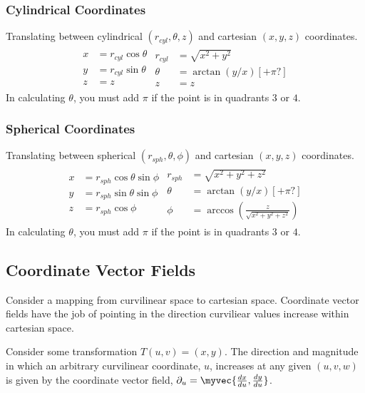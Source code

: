 \documentclass[11pt]{article}
\newenvironment{mybox}
{\begin{tcolorbox}[colback=red!5!white,colframe=red!75!black]}
{\end{tcolorbox}}
\begin{document}
\subsubsection{Cylindrical Coordinates}
\begin{mybox}
    Translating between cylindrical $(r_{cyl},\theta,z)$ and cartesian $(x,y,z)$ coordinates.
    \begin{align*}
        \begin{split}
            x &= r_{cyl}\cos{\theta}\\
            y &= r_{cyl}\sin{\theta}\\
            z &= z
        \end{split}
        \begin{split}
            r_{cyl} &= \sqrt{x^2+y^2} \\
        \theta &= \arctan{\left(y/x\right)} [+\pi?]\\
        z &= z
        \end{split}
    \end{align*}
    In calculating $\theta$, you must add $\pi$ if the point is in quadrants $3$ or $4$.
\end{mybox}
\subsubsection{Spherical Coordinates}
\begin{mybox}
Translating between spherical $(r_{sph},\theta,\phi)$ and cartesian $(x,y,z)$ coordinates.
    \begin{align*}
        \begin{split}
            x &= r_{sph}\cos{\theta}\sin{\phi}\\
            y &= r_{sph}\sin{\theta}\sin{\phi}\\
            z &= r_{sph}\cos{\phi}
        \end{split}
        \begin{split}
            r_{sph} &= \sqrt{x^2+y^2+z^2}\\
            \theta  &= \arctan{\left(y/x\right)} [+\pi?]\\
            \phi    &= \arccos{\left(\frac{z}{\sqrt{x^2+y^2+z^2}}\right)}
        \end{split}
    \end{align*}
    In calculating $\theta$, you must add $\pi$ if the point is in quadrants $3$ or $4$.
\end{mybox}

\subsection{Coordinate Vector Fields}
Consider a mapping from curvilinear space to cartesian space. Coordinate vector fields have the job of pointing in the direction curviliear values increase within cartesian space.
\begin{mybox}
    Consider some transformation $T(u,v)=(x,y)$. The direction and magnitude in which an arbitrary curvilinear coordinate, $u$, increases at any given $(u,v,w)$ is given by the coordinate vector field, $\partial_u = \myvec{\frac{dx}{du},\frac{dy}{du}}$.
\end{mybox}
\end{document}
